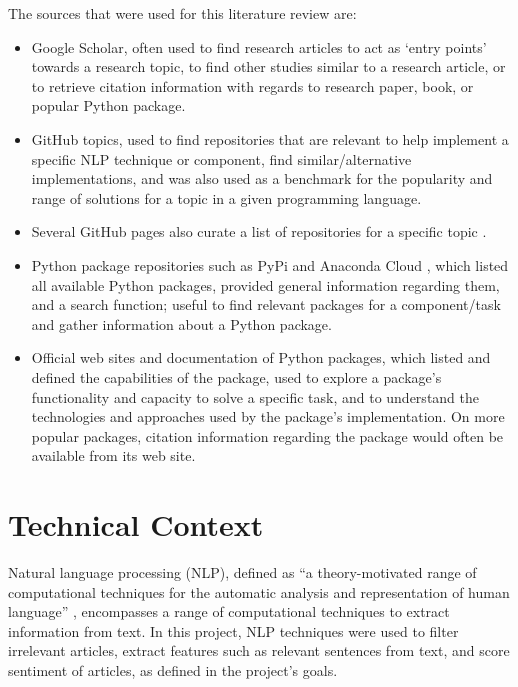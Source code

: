 \documentclass{report}
\begin{document}
The sources that were used for this literature review are:
\begin{itemize}
	\item Google Scholar, often used to find research articles to act as `entry points' towards a research topic, to find other studies similar to a research article, or to retrieve citation information with regards to research paper, book, or popular Python package.
	\item GitHub topics, used to find repositories that are relevant to help implement a specific NLP technique or component, find similar/alternative implementations, and was also used as a benchmark for the popularity and range of solutions for a topic in a given programming language.
	\item Several GitHub pages also curate a list of repositories for a specific topic \cite{awesome-sentiment-analysis, awesome-nlp, awesome-machine-learning}.
	\item Python package repositories such as PyPi \cite{PyPi} and Anaconda Cloud \cite{Anaconda-Cloud}, which listed all available Python packages, provided general information regarding them, and a search function; useful to find relevant packages for a component/task and gather information about a Python package.
	\item Official web sites and documentation of Python packages, which listed and defined the capabilities of the package, used to explore a package's functionality and capacity to solve a specific task, and to understand the technologies and approaches used by the package's implementation. 
		On more popular packages, citation information regarding the package would often be available from its web site.
\end{itemize}

\section{Technical Context} \label{Technical Context}  %

Natural language processing (NLP), defined as ``a theory-motivated range of computational techniques for the automatic analysis and representation of human language'' \cite{cambria2014jumping}, encompasses a range of computational techniques to extract information from text.
In this project, NLP techniques were used to filter irrelevant articles, extract features such as relevant sentences from text, and score sentiment of articles, as defined in the project's goals.
\end{document}
